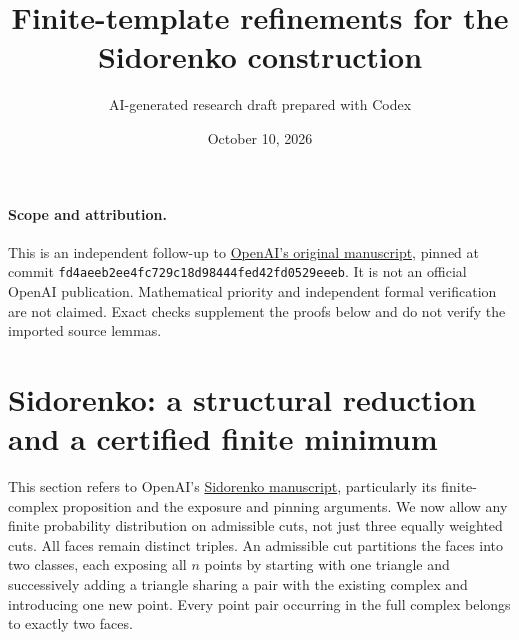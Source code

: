\documentclass[11pt]{article}
\title{Finite-template refinements for the Sidorenko construction}
\author{AI-generated research draft prepared with Codex}
\date{October 10, 2026}
\begin{document}
\maketitle
\paragraph{Scope and attribution.}
This is an independent follow-up to
\href{https://github.com/openai/math/tree/fd4aeeb2ee4fc729c18d98444fed42fd0529eeeb/preprints/A-counterexample-to-Sidorenkos-conjecture-September-23-2026}{OpenAI's original manuscript},
pinned at commit \texttt{fd4aeeb2ee4fc729c18d98444fed42fd0529eeeb}.
It is not an official OpenAI publication. Mathematical priority and
independent formal verification are not claimed. Exact checks supplement
the proofs below and do not verify the imported source lemmas.
\section{Sidorenko: a structural reduction and a certified finite minimum}
\label{sec:sidorenko-minimum}
This section refers to OpenAI's
\href{https://github.com/openai/math/tree/fd4aeeb2ee4fc729c18d98444fed42fd0529eeeb/preprints/A-counterexample-to-Sidorenkos-conjecture-September-23-2026}{Sidorenko manuscript},
particularly its finite-complex proposition and the exposure and pinning arguments.
We now allow any finite probability distribution on admissible cuts,
not just three equally weighted cuts. All faces remain distinct triples.
An admissible cut partitions the faces into two classes, each exposing
all $n$ points by starting with one triangle and successively adding a
triangle sharing a pair with the existing complex and introducing one
new point. Every point pair occurring in the full complex belongs to
exactly two faces.
\end{document}
